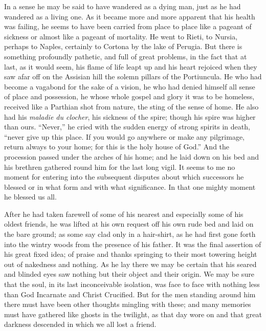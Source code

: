 \documentclass{book}
\begin{document}
In a sense he may be said to have wandered as a dying man, just as he had wandered as a living one. As it became more and more apparent that his health was failing, he seems to have been carried from place to place like a pageant of sickness or almost like a pageant of mortality. He went to Rieti, to Nursia, perhaps to Naples, certainly to Cortona by the lake of Perugia. But there is something profoundly pathetic, and full of great problems, in the fact that at last, as it would seem, his flame of life leapt up and his heart rejoiced when they saw afar off on the Assisian hill the solemn pillars of the Portiuncula. He who had become a vagabond for the sake of a vision, he who had denied himself all sense of place and possession, he whose whole gospel and glory it was to be homeless, received like a Parthian shot from nature, the sting of the sense of home. He also had his \emph{maladie du clocher}, his sickness of the spire; though his spire was higher than ours. “Never,” he cried with the sudden energy of strong spirits in death, “never give up this place. If you would go anywhere or make any pilgrimage, return always to your home; for this is the holy house of God.” And the procession passed under the arches of his home; and he laid down on his bed and his brethren gathered round him for the last long vigil. It seems to me no moment for entering into the subsequent disputes about which successors he blessed or in what form and with what significance. In that one mighty moment he blessed us all.

After he had taken farewell of some of his nearest and especially some of his oldest friends, he was lifted at his own request off his own rude bed and laid on the bare ground; as some say clad only in a hair-shirt, as he had first gone forth into the wintry woods from the presence of his father. It was the final assertion of his great fixed idea; of praise and thanks springing to their most towering height out of nakedness and nothing. As he lay there we may be certain that his seared and blinded eyes saw nothing but their object and their origin. We may be sure that the soul, in its last inconceivable isolation, was face to face with nothing less than God Incarnate and Christ Crucified. But for the men standing around him there must have been other thoughts mingling with these; and many memories must have gathered like ghosts in the twilight, as that day wore on and that great darkness descended in which we all lost a friend.
\end{document}
